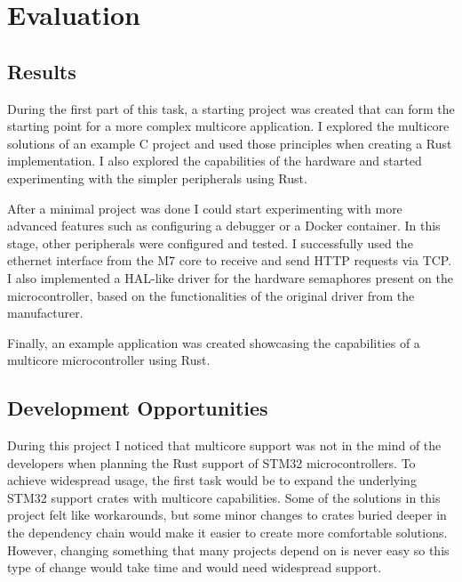 \chapter{Evaluation}

\section{Results}

During the first part of this task, a starting project was created that can form the starting point for a more complex multicore application. I explored the multicore solutions of an example C project and used those principles when creating a Rust implementation. I also explored the capabilities of the hardware and started experimenting with the simpler peripherals using Rust.

After a minimal project was done I could start experimenting with more advanced features such as configuring a debugger or a Docker container. In this stage, other peripherals were configured and tested. I successfully used the ethernet interface from the M7 core to receive and send HTTP requests via TCP. I also implemented a HAL-like driver for the hardware semaphores present on the microcontroller, based on the functionalities of the original driver from the manufacturer.

Finally, an example application was created showcasing the capabilities of a multicore microcontroller using Rust.

\section{Development Opportunities}

During this project I noticed that multicore support was not in the mind of the developers when planning the Rust support of STM32 microcontrollers. To achieve widespread usage, the first task would be to expand the underlying STM32 support crates with multicore capabilities. Some of the solutions in this project felt like workarounds, but some minor changes to crates buried deeper in the dependency chain would make it easier to create more comfortable solutions. However, changing something that many projects depend on is never easy so this type of change would take time and would need widespread support.
